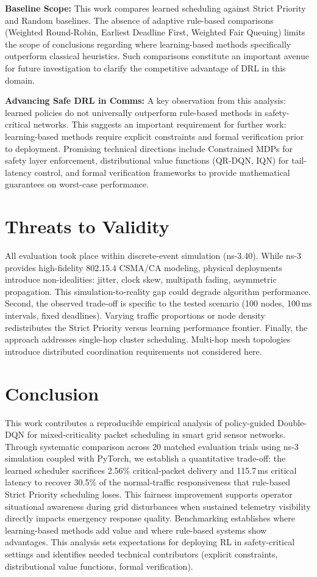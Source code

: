 \documentclass[runningheads,a4paper]{llncs}
\begin{document}
\textbf{Baseline Scope:} This work compares learned scheduling against Strict Priority and Random baselines. The absence of adaptive rule-based comparisons (Weighted Round-Robin, Earliest Deadline First, Weighted Fair Queuing) limits the scope of conclusions regarding where learning-based methods specifically outperform classical heuristics. Such comparisons constitute an important avenue for future investigation to clarify the competitive advantage of DRL in this domain.

\textbf{Advancing Safe DRL in Comms:} A key observation from this analysis: learned policies do not universally outperform rule-based methods in safety-critical networks. This suggests an important requirement for further work: learning-based methods require explicit constraints and formal verification prior to deployment. Promising technical directions include Constrained MDPs for safety layer enforcement, distributional value functions (QR-DQN, IQN) for tail-latency control, and formal verification frameworks to provide mathematical guarantees on worst-case performance.

\section{Threats to Validity}
All evaluation took place within discrete-event simulation (ns-3.40). While ns-3 provides high-fidelity 802.15.4 CSMA/CA modeling, physical deployments introduce non-idealities: jitter, clock skew, multipath fading, asymmetric propagation. This simulation-to-reality gap could degrade algorithm performance. Second, the observed trade-off is specific to the tested scenario (100 nodes, 100\,ms intervals, fixed deadlines). Varying traffic proportions or node density redistributes the Strict Priority versus learning performance frontier. Finally, the approach addresses single-hop cluster scheduling. Multi-hop mesh topologies introduce distributed coordination requirements not considered here.

\section{Conclusion}
This work contributes a reproducible empirical analysis of policy-guided Double-DQN for mixed-criticality packet scheduling in smart grid sensor networks. Through systematic comparison across 20 matched evaluation trials using ns-3 simulation coupled with PyTorch, we establish a quantitative trade-off: the learned scheduler sacrifices 2.56\% critical-packet delivery and 115.7\,ms critical latency to recover 30.5\% of the normal-traffic responsiveness that rule-based Strict Priority scheduling loses. This fairness improvement supports operator situational awareness during grid disturbances when sustained telemetry visibility directly impacts emergency response quality. Benchmarking establishes where learning-based methods add value and where rule-based systems show advantages. This analysis sets expectations for deploying RL in safety-critical settings and identifies needed technical contributors (explicit constraints, distributional value functions, formal verification).
\end{document}
